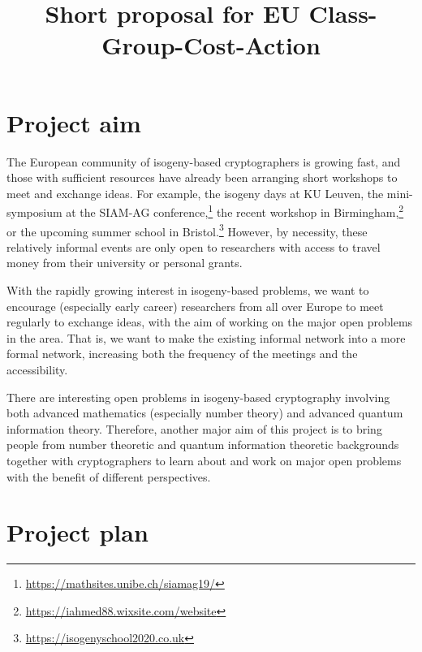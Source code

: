 \documentclass{article}
\begin{document}
\newcommand{\red}{\color{red}}

\title{Short proposal for EU Class-Group-Cost-Action}

\maketitle

\section{Project aim}

The European community of isogeny-based cryptographers is growing fast,
and those with sufficient resources have already been arranging short workshops to meet and exchange ideas.
For example, the isogeny days at KU Leuven,
the mini-symposium at the SIAM-AG conference,\footnote{
\url{https://mathsites.unibe.ch/siamag19/}}
the recent workshop in Birmingham,\footnote{
\url{https://iahmed88.wixsite.com/website}}
or the upcoming summer school in Bristol.\footnote{
\url{https://isogenyschool2020.co.uk}}
However, by necessity, these relatively informal events are only open to
researchers with access to travel money from their university or personal grants.

With the rapidly growing interest in isogeny-based problems,
we want to encourage (especially early career) researchers from all over Europe
to meet regularly to exchange ideas, 
with the aim of working on the major open problems in the area.
That is, we want to make the existing informal network into a more formal network,
increasing both the frequency of the meetings and the accessibility.

There are interesting open problems in isogeny-based cryptography 
involving both advanced mathematics (especially number theory) and advanced quantum information theory.
Therefore, another major aim of this project is to bring people from number theoretic and quantum information theoretic backgrounds together with cryptographers to learn about and work on major open problems with the benefit of different perspectives.

\section{Project plan}
\end{document}
